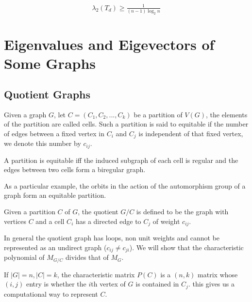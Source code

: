 \documentclass{math}
\begin{document}
\begin{lemma}
    \begin{align*}
        \lambda_2(T_d) \geq \frac{1}{(n - 1) \log_2 n}
    \end{align*}
\end{lemma}

\section{Eigenvalues and Eigevectors of Some Graphs}

\subsection{Quotient Graphs}

\begin{definition}
    Given a graph $G$, let $C = (C_1, C_2, ..., C_k)$ be a partition of $V(G)$, the elements of the partition are called cells.
    Such a partition is said to equitable if the number of edges between a fixed vertex in $C_i$ and $C_j$
    is independent of that fixed vertex, we denote this number by $c_{ij}$.        
\end{definition}

\begin{lemma}
    A partition is equitable iff the induced subgraph of each cell is regular and the edges between two cells form a biregular graph.
\end{lemma}

As a particular example, the orbits in the action of the automorphism group of a graph form an equitable partition.

\begin{definition}
    Given a partition $C$ of $G$, the quotient $G/C$ is defined to be the graph with vertices $C$ and a cell $C_i$ has a directed edge to $C_j$ of weight $c_{ij}$.
\end{definition}

In general the quotient graph has loops, non unit weights and cannot be represented as an undirect graph ($c_{ij} \neq c_{ji}$).
We will show that the characteristic polynomial of $M_{G/C}$ divides that of $M_{G}$.

If $|G| = n, |C| = k$, the characteristic matrix $P(C)$ is a $(n,k)$ matrix whose $(i, j)$ entry is whether the $i$th vertex of $G$ is contained in $C_j$.
this gives us a computational way to represent $C$.
\end{document}
